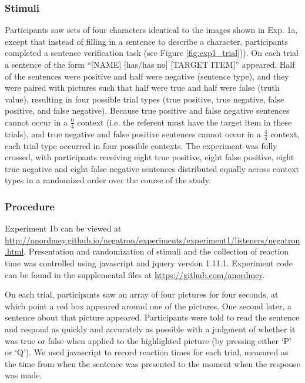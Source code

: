 \documentclass[man, floatsintext, noapacite]{apa6}
\begin{document}
\subsubsection{Stimuli}

Participants saw sets of four characters identical to the images shown in Exp. 1a, except that instead of filling in a sentence to describe a character, participants completed a sentence verification task (see Figure \ref{fig:exp1_trial})). On each trial a sentence of the form ``[NAME] [has/has no] [TARGET ITEM]'' appeared.  Half of the sentences were positive and half were negative (sentence type), and they were paired with pictures such that half were true and half were false (truth value), resulting in four possible trial types (true positive, true negative, false positive, and false negative).  Because true positive and false negative sentences cannot occur in a $\frac{0}{4}$ context (i.e. the referent must have the target item in these trials), and true negative and false positive sentences cannot occur in a $\frac{4}{4}$ context, each trial type occurred in four possible contexts.  The experiment was fully crossed, with participants receiving eight true positive, eight false positive, eight true negative and eight false negative sentences distributed equally across context types in a randomized order over the course of the study.  

\subsubsection{Procedure}

Experiment 1b can be viewed at \url{http://anordmey.github.io/negatron/experiments/experiment1/listeners/negatron.html}. Presentation and randomization of stimuli and the collection of reaction time was controlled using javascript and jquery version 1.11.1. Experiment code can be found in the supplemental files at  \url{https://github.com/anordmey}.

On each trial, participants saw an array of four pictures for four seconds, at which point a red box appeared around one of the pictures. One second later, a sentence about that picture appeared. Participants were told to read the sentence and respond as quickly and accurately as possible with a judgment of whether it was true or false when applied to the highlighted picture (by pressing either `P' or `Q').  We used javascript to record reaction times for each trial, measured as the time from when the sentence was presented to the moment when the response was made.
\end{document}
